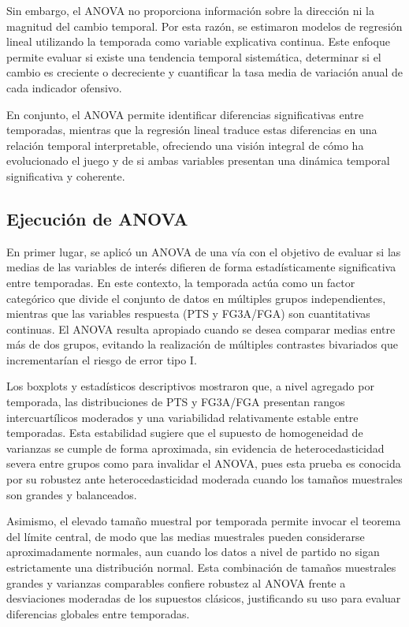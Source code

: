 \documentclass[12pt]{article}
\begin{document}
Sin embargo, el ANOVA no proporciona información sobre la dirección ni la magnitud del cambio
temporal. Por esta razón, se estimaron modelos de regresión lineal utilizando la temporada
como variable explicativa continua. Este enfoque permite evaluar si existe una tendencia
temporal sistemática, determinar si el cambio es creciente o decreciente y cuantificar la
tasa media de variación anual de cada indicador ofensivo.

En conjunto, el ANOVA permite identificar diferencias significativas entre temporadas, mientras
que la regresión lineal traduce estas diferencias en una relación temporal interpretable,
ofreciendo una visión integral de cómo ha evolucionado el juego y de si ambas variables
presentan una dinámica temporal significativa y coherente.

\subsection{Ejecución de ANOVA}

En primer lugar, se aplicó un ANOVA de una vía con el objetivo de evaluar si las medias
de las variables de interés difieren de forma estadísticamente significativa entre
temporadas. En este contexto, la temporada actúa como un factor categórico que divide el
conjunto de datos en múltiples grupos independientes, mientras que las variables respuesta
(PTS y FG3A/FGA) son cuantitativas continuas. El ANOVA resulta apropiado cuando se desea
comparar medias entre más de dos grupos, evitando la realización de múltiples contrastes
bivariados que incrementarían el riesgo de error tipo I.

Los boxplots y
estadísticos descriptivos mostraron que, a nivel agregado por temporada, las distribuciones
de PTS y FG3A/FGA presentan rangos intercuartílicos moderados y una variabilidad relativamente
estable entre temporadas. Esta estabilidad sugiere que el supuesto de homogeneidad de
varianzas se cumple de forma aproximada, sin evidencia de heterocedasticidad severa entre
grupos como para invalidar el ANOVA, pues esta prueba es conocida por su robustez 
ante heterocedasticidad moderada cuando los tamaños muestrales son grandes y balanceados.

Asimismo, el elevado tamaño muestral por temporada permite invocar el teorema del límite
central, de modo que las medias muestrales pueden considerarse aproximadamente normales,
aun cuando los datos a nivel de partido no sigan estrictamente una distribución normal.
Esta combinación de tamaños muestrales grandes y varianzas comparables confiere robustez al
ANOVA frente a desviaciones moderadas de los supuestos clásicos, justificando su uso para
evaluar diferencias globales entre temporadas.
\end{document}
